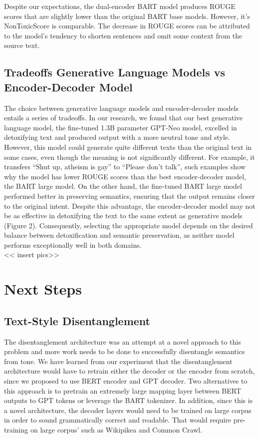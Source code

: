 \documentclass[11pt]{article}
\begin{document}
Despite our expectations, the dual-encoder BART model produces ROUGE scores that are slightly lower than the original BART base models. However, it’s NonToxicScore is comparable. The decrease in ROUGE scores can be attributed to the model's tendency to shorten sentences and omit some context from the source text.

\subsection{Tradeoffs Generative Language Models vs Encoder-Decoder Model}
The choice between generative language models and encoder-decoder models entails a series of tradeoffs. In our research, we found that our best generative language model, the fine-tuned 1.3B parameter GPT-Neo model, excelled in detoxifying text and produced output with a more neutral tone and style. However, this model could generate quite different texts than the original text in some cases, even though the meaning is not significantly different. For example, it transfers “Shut up, atheism is gay” to “Please don't talk”, such examples show why the model has lower ROUGE scores than the best encoder-decoder model, the BART large model. On the other hand, the fine-tuned BART large model performed better in preserving semantics, ensuring that the output remains closer to the original intent. Despite this advantage, the encoder-decoder model may not be as effective in detoxifying the text to the same extent as generative models (Figure 2). Consequently, selecting the appropriate model depends on the desired balance between detoxification and semantic preservation, as neither model performs exceptionally well in both domains.\\
<< insert pics>>

\section{Next Steps}
\subsection{Text-Style Disentanglement}
The disentanglement architecture was an attempt at a novel approach to this problem and more work needs to be done to successfully disentangle semantics from tone. We have learned from our experiment that the disentanglement architecture would have to retrain either the decoder or the encoder from scratch, since we proposed to use BERT encoder and GPT decoder. Two alternatives to this approach is to pretrain an extremely large mapping layer between BERT outputs to GPT tokens or leverage the BART tokenizer. 
In addition, since this is a novel architecture, the decoder layers would need to be trained on large corpus in order to sound grammatically correct and readable. That would require pre-training on large corpus’ such as Wikipikea and Common Crawl.
\end{document}
